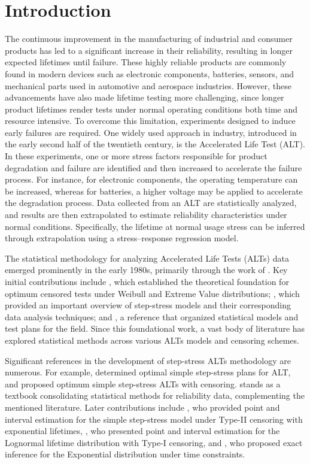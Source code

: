 \documentclass{article}
\begin{document}
\section{Introduction}
The continuous improvement in the manufacturing of industrial and consumer products has led to a significant increase in their reliability, resulting in longer expected lifetimes until failure. These highly reliable products are commonly found in modern devices such as electronic components, batteries, sensors, and mechanical parts used in automotive and aerospace industries. However, these advancements have also made lifetime testing more challenging, since longer product lifetimes render tests under normal operating conditions both time and resource intensive.
%
To overcome this limitation, experiments designed to induce early failures are required. One widely used approach in industry, introduced in the early second half of the twentieth century, is the Accelerated Life Test (ALT). In these experiments, one or more stress factors responsible for product degradation and failure are identified and then increased to accelerate the failure process. For instance, for electronic components, the operating temperature can be increased, whereas for batteries, a higher voltage may be applied to accelerate the degradation process.
%
Data collected from an ALT are statistically analyzed, and results are then extrapolated to estimate reliability characteristics under normal conditions. Specifically, the lifetime at normal usage stress can be inferred through extrapolation using a stress–response regression model.
%

The statistical methodology for analyzing Accelerated Life Tests (ALTs) data emerged prominently in the early 1980s, primarily through the work of \cite{nelson1978, nelson1980, nelson1990}. Key initial contributions include \cite{nelson1978}, which established the theoretical foundation for optimum censored tests under Weibull and Extreme Value distributions; \cite{nelson1980}, which provided an important overview of step-stress models and their corresponding data analysis techniques; and \cite{nelson1990}, a reference that organized statistical models and test plans for the field. Since this foundational work, a vast body of literature has explored statistical methods across various ALTs models and censoring schemes.

Significant references in the development of step-stress ALTs methodology are numerous. For example, \cite{miller1983} determined optimal simple step-stress plans for ALT, and \cite{bai1989} proposed optimum simple step-stress ALTs with censoring. \cite{meeker1998} stands as a textbook consolidating statistical methods for reliability data, complementing the mentioned literature. Later contributions include \cite{balakrishnan2007}, who provided point and interval estimation for the simple step-stress model under Type-II censoring with exponential lifetimes, \cite{balakrishnan2009a}, who presented point and interval estimation for the Lognormal lifetime distribution with Type-I censoring, and \cite{balakrishnan2009b}, who proposed exact inference for the Exponential distribution under time constraints.
\end{document}

